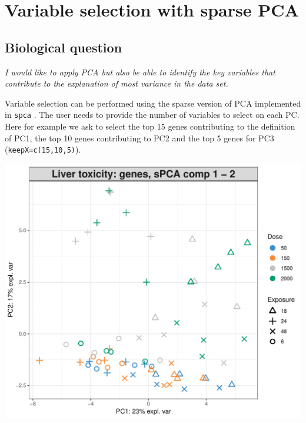 \documentclass[]{book}
\newenvironment{Shaded}{\begin{snugshade}}{\end{snugshade}}
\newcommand{\CommentTok}[1]{\textcolor[rgb]{0.56,0.35,0.01}{\textit{#1}}}
\newcommand{\DataTypeTok}[1]{\textcolor[rgb]{0.13,0.29,0.53}{#1}}
\newcommand{\DecValTok}[1]{\textcolor[rgb]{0.00,0.00,0.81}{#1}}
\newcommand{\KeywordTok}[1]{\textcolor[rgb]{0.13,0.29,0.53}{\textbf{#1}}}
\newcommand{\NormalTok}[1]{#1}
\newcommand{\OperatorTok}[1]{\textcolor[rgb]{0.81,0.36,0.00}{\textbf{#1}}}
\newcommand{\OtherTok}[1]{\textcolor[rgb]{0.56,0.35,0.01}{#1}}
\newcommand{\StringTok}[1]{\textcolor[rgb]{0.31,0.60,0.02}{#1}}
\begin{document}
\hypertarget{sPCA}{%
\section{Variable selection with sparse PCA}\label{sPCA}}

\hypertarget{biological-question-1}{%
\subsection{Biological question}\label{biological-question-1}}

{
\emph{I would like to apply PCA but also be able to identify the key variables that contribute to the explanation of most variance in the data set.}
}

Variable selection can be performed using the sparse version of PCA implemented in \texttt{spca} \citep{She08}. The user needs to provide the number of variables to select on each PC. Here for example we ask to select the top 15 genes contributing to the definition of PC1, the top 10 genes contributing to PC2 and the top 5 genes for PC3 (\texttt{keepX=c(15,10,5)}).

\begin{Shaded}
\end{Shaded}

\begin{center}\includegraphics[width=0.5\linewidth,]{Figures/03-pca-liver-plotIndiv-args-1} \end{center}
\end{document}
